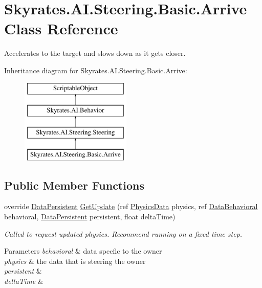 \hypertarget{class_skyrates_1_1_a_i_1_1_steering_1_1_basic_1_1_arrive}{\section{Skyrates.\-A\-I.\-Steering.\-Basic.\-Arrive Class Reference}
\label{class_skyrates_1_1_a_i_1_1_steering_1_1_basic_1_1_arrive}
}


Accelerates to the target and slows down as it gets closer.  


Inheritance diagram for Skyrates.\-A\-I.\-Steering.\-Basic.\-Arrive\-:\begin{figure}[H]
\begin{center}
\leavevmode
\includegraphics[height=4.000000cm]{class_skyrates_1_1_a_i_1_1_steering_1_1_basic_1_1_arrive}
\end{center}
\end{figure}
\subsection*{Public Member Functions}
\begin{DoxyCompactItemize}
\item 
\hypertarget{class_skyrates_1_1_a_i_1_1_steering_1_1_basic_1_1_arrive_aa9f83ff167d40cac6120d1fadc280ff7}{override \hyperlink{class_skyrates_1_1_a_i_1_1_behavior_1_1_data_persistent}{Data\-Persistent} \hyperlink{class_skyrates_1_1_a_i_1_1_steering_1_1_basic_1_1_arrive_aa9f83ff167d40cac6120d1fadc280ff7}{Get\-Update} (ref \hyperlink{class_skyrates_1_1_physics_1_1_physics_data}{Physics\-Data} physics, ref \hyperlink{class_skyrates_1_1_a_i_1_1_behavior_1_1_data_behavioral}{Data\-Behavioral} behavioral, \hyperlink{class_skyrates_1_1_a_i_1_1_behavior_1_1_data_persistent}{Data\-Persistent} persistent, float delta\-Time)}\label{class_skyrates_1_1_a_i_1_1_steering_1_1_basic_1_1_arrive_aa9f83ff167d40cac6120d1fadc280ff7}

\begin{DoxyCompactList}\small\item\em Called to request updated physics. Recommend running on a fixed time step. 


\begin{DoxyParams}{Parameters}
{\em behavioral} & data specfic to the owner\\
\hline
{\em physics} & the data that is steering the owner\\
\hline
{\em persistent} & \\
\hline
{\em delta\-Time} & \\
\hline
\end{DoxyParams}
 \end{DoxyCompactList}\end{DoxyCompactItemize}
